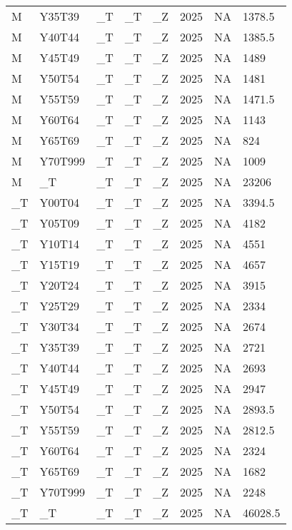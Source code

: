 \begin{longtable}[t]{llllllll}
M & Y35T39 & \_T & \_T & \_Z & 2025 & NA & 1378.5\\
M & Y40T44 & \_T & \_T & \_Z & 2025 & NA & 1385.5\\
M & Y45T49 & \_T & \_T & \_Z & 2025 & NA & 1489\\
M & Y50T54 & \_T & \_T & \_Z & 2025 & NA & 1481\\
\addlinespace
M & Y55T59 & \_T & \_T & \_Z & 2025 & NA & 1471.5\\
M & Y60T64 & \_T & \_T & \_Z & 2025 & NA & 1143\\
M & Y65T69 & \_T & \_T & \_Z & 2025 & NA & 824\\
M & Y70T999 & \_T & \_T & \_Z & 2025 & NA & 1009\\
M & \_T & \_T & \_T & \_Z & 2025 & NA & 23206\\
\addlinespace
\_T & Y00T04 & \_T & \_T & \_Z & 2025 & NA & 3394.5\\
\_T & Y05T09 & \_T & \_T & \_Z & 2025 & NA & 4182\\
\_T & Y10T14 & \_T & \_T & \_Z & 2025 & NA & 4551\\
\_T & Y15T19 & \_T & \_T & \_Z & 2025 & NA & 4657\\
\_T & Y20T24 & \_T & \_T & \_Z & 2025 & NA & 3915\\
\addlinespace
\_T & Y25T29 & \_T & \_T & \_Z & 2025 & NA & 2334\\
\_T & Y30T34 & \_T & \_T & \_Z & 2025 & NA & 2674\\
\_T & Y35T39 & \_T & \_T & \_Z & 2025 & NA & 2721\\
\_T & Y40T44 & \_T & \_T & \_Z & 2025 & NA & 2693\\
\_T & Y45T49 & \_T & \_T & \_Z & 2025 & NA & 2947\\
\addlinespace
\_T & Y50T54 & \_T & \_T & \_Z & 2025 & NA & 2893.5\\
\_T & Y55T59 & \_T & \_T & \_Z & 2025 & NA & 2812.5\\
\_T & Y60T64 & \_T & \_T & \_Z & 2025 & NA & 2324\\
\_T & Y65T69 & \_T & \_T & \_Z & 2025 & NA & 1682\\
\_T & Y70T999 & \_T & \_T & \_Z & 2025 & NA & 2248\\
\addlinespace
\_T & \_T & \_T & \_T & \_Z & 2025 & NA & 46028.5\\*
\end{longtable}
